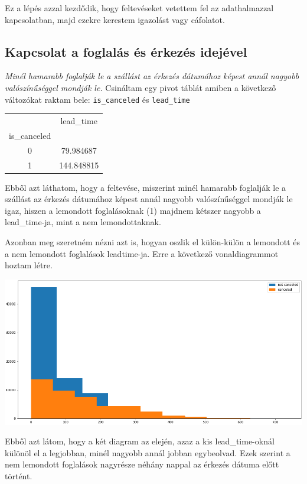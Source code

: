 Ez a lépés azzal kezdődik, hogy feltevéseket vetettem fel az adathalmazzal kapcsolatban, majd ezekre kerestem igazolást vagy cáfolatot.

\subsection{Kapcsolat a foglalás és érkezés idejével}

\textit{Minél hamarabb foglalják le a szállást az érkezés dátumához képest annál nagyobb valószínűséggel mondják le.}
Csináltam egy pivot táblát amiben a következő változókat raktam bele: \texttt{is\_canceled} és \texttt{lead\_time}

\begin{center}
\begin{tabular}{ c c  }
  & lead\_time \\ 
 is\_canceled &  \\  
  0 & 79.984687 \\
  1 & 144.848815
\end{tabular}
\end{center}

Ebből azt láthatom, hogy a feltevése, miszerint minél hamarabb foglalják le a szállást az érkezés dátumához képest annál nagyobb valószínűséggel mondják le igaz, hiszen a lemondott foglalásoknak (1) majdnem kétszer nagyobb a lead\_time-ja, mint a nem lemondottaknak.

Azonban meg szeretném nézni azt is, hogyan oszlik el külön-külön a lemondott és a nem lemondott foglalások lead\-time-ja. Erre a következő vonaldiagrammot hoztam létre.

\includegraphics[scale=0.57]{images/4.fejezet/3.adatelemzes1.PNG}

Ebből azt látom, hogy a két diagram az elején, azaz a kis lead\_time-oknál különöl el a legjobban, minél nagyobb annál jobban egybeolvad. Ezek szerint a nem lemondott foglalások nagyrésze néhány nappal az érkezés dátuma előtt történt.

